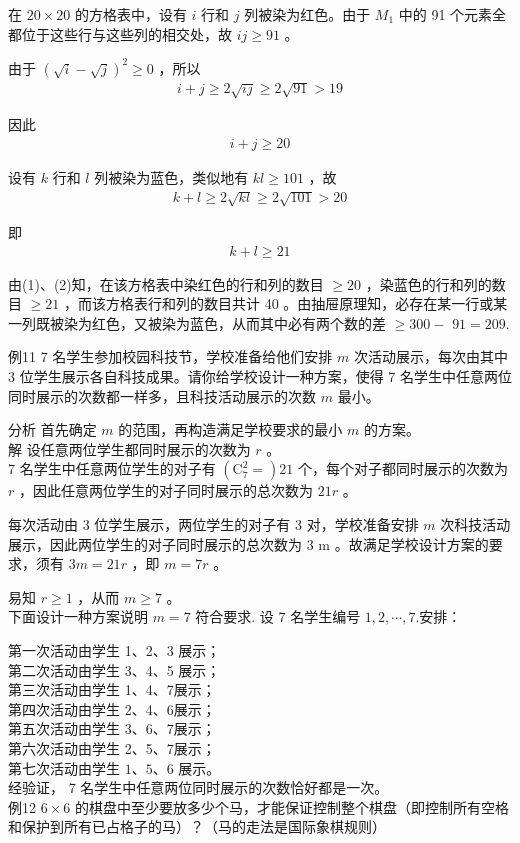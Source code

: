 \documentclass[10pt]{article}
\begin{document}
在 $20 \times 20$ 的方格表中，设有 $i$ 行和 $j$ 列被染为红色。由于 $M_{1}$ 中的 91 个元素全都位于这些行与这些列的相交处，故 $i j \geqslant 91$ 。

由于 $(\sqrt{i}-\sqrt{j})^{2} \geqslant 0$ ，所以\\
\begin{align*}
i+j \geqslant 2 \sqrt{i j} \geqslant 2 \sqrt{91}>19
\end{align*}

因此\\
\begin{align*}
i+j \geqslant 20
\end{align*}

设有 $k$ 行和 $l$ 列被染为蓝色，类似地有 $k l \geqslant 101$ ，故\\
\begin{align*}
k+l \geqslant 2 \sqrt{k l} \geqslant 2 \sqrt{101}>20
\end{align*}

即\\
\begin{align*}
k+l \geqslant 21
\end{align*}

由(1)、(2)知，在该方格表中染红色的行和列的数目 $\geqslant 20$ ，染蓝色的行和列的数目 $\geqslant 21$ ，而该方格表行和列的数目共计 40 。由抽屉原理知，必存在某一行或某一列既被染为红色，又被染为蓝色，从而其中必有两个数的差 $\geqslant 300-$ $91=209$.

例11 7 名学生参加校园科技节，学校准备给他们安排 $m$ 次活动展示，每次由其中 3 位学生展示各自科技成果。请你给学校设计一种方案，使得 7 名学生中任意两位同时展示的次数都一样多，且科技活动展示的次数 $m$ 最小。

分析 首先确定 $m$ 的范围，再构造满足学校要求的最小 $m$ 的方案。\\
解 设任意两位学生都同时展示的次数为 $r$ 。\\
7 名学生中任意两位学生的对子有 $\left(\mathrm{C}_{7}^{2}=\right) 21$ 个，每个对子都同时展示的次数为 $r$ ，因此任意两位学生的对子同时展示的总次数为 $21 r$ 。

每次活动由 3 位学生展示，两位学生的对子有 3 对，学校准备安排 $m$ 次科技活动展示，因此两位学生的对子同时展示的总次数为 3 m 。故满足学校设计方案的要求，须有 $3 m=21 r$ ，即 $m=7 r$ 。

易知 $r \geqslant 1$ ，从而 $m \geqslant 7$ 。\\
下面设计一种方案说明 $m=7$ 符合要求. 设 7 名学生编号 $1,2, \cdots, 7$.安排：

第一次活动由学生 1、2、3 展示；\\
第二次活动由学生 3、4、5 展示；\\
第三次活动由学生 1、4、7展示；\\
第四次活动由学生 2、4、6展示；\\
第五次活动由学生 3、6、7展示；\\
第六次活动由学生 2、5、7展示；\\
第七次活动由学生 $1 、 5 、 6$ 展示。\\
经验证， 7 名学生中任意两位同时展示的次数恰好都是一次。\\
例12 $6 \times 6$ 的棋盘中至少要放多少个马，才能保证控制整个棋盘（即控制所有空格和保护到所有已占格子的马）？（马的走法是国际象棋规则）
\end{document}
